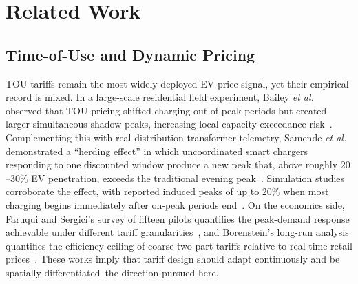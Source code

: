 \documentclass[10pt,journal]{IEEEtran}
\begin{document}
\section{Related Work}\label{sec:rw}

\subsection{Time-of-Use and Dynamic Pricing}
TOU tariffs remain the most widely deployed EV price signal, yet their
empirical record is mixed. In a large-scale residential field experiment,
Bailey \emph{et al.} observed that TOU pricing shifted charging out of peak
periods but created larger simultaneous shadow peaks, increasing local
capacity-exceedance risk~\cite{bailey2025}. Complementing this with real
distribution-transformer telemetry, Samende \emph{et al.} demonstrated a
``herding effect'' in which uncoordinated smart chargers responding to one
discounted window produce a new peak that, above roughly $20$--$30\%$ EV
penetration, exceeds the traditional evening
peak~\cite{samende2025}. Simulation studies corroborate the effect, with
reported induced peaks of up to $20\%$ when most charging begins immediately
after on-peak periods end~\cite{jones2022}. On the economics side, Faruqui
and Sergici's survey of fifteen pilots quantifies the peak-demand response
achievable under different tariff granularities~\cite{faruqui2010}, and
Borenstein's long-run analysis quantifies the efficiency ceiling of coarse
two-part tariffs relative to real-time retail prices~\cite{borenstein2005}.
These works imply that tariff design should adapt continuously and be
spatially differentiated--the direction pursued here.
\end{document}
